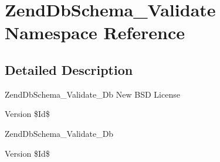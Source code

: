 \hypertarget{namespaceZendDbSchema__Validate}{\section{\-Zend\-Db\-Schema\-\_\-\-Validate \-Namespace \-Reference}
\label{namespaceZendDbSchema__Validate}
}


\subsection{\-Detailed \-Description}
\-Zend\-Db\-Schema\-\_\-\-Validate\-\_\-\-Db  \-New \-B\-S\-D \-License \begin{DoxyVersion}{\-Version}
\$\-Id\$
\end{DoxyVersion}
\-Zend\-Db\-Schema\-\_\-\-Validate\-\_\-\-Db \begin{DoxyVersion}{\-Version}
\$\-Id\$ 
\end{DoxyVersion}
